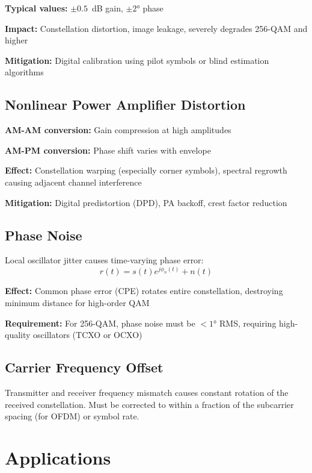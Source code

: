\textbf{Typical values:} $\pm 0.5$~dB gain, $\pm 2°$ phase

\textbf{Impact:} Constellation distortion, image leakage, severely degrades 256-QAM and higher

\textbf{Mitigation:} Digital calibration using pilot symbols or blind estimation algorithms

\subsection{Nonlinear Power Amplifier Distortion}

\textbf{AM-AM conversion:} Gain compression at high amplitudes

\textbf{AM-PM conversion:} Phase shift varies with envelope

\textbf{Effect:} Constellation warping (especially corner symbols), spectral regrowth causing adjacent channel interference

\textbf{Mitigation:} Digital predistortion (DPD), PA backoff, crest factor reduction

\subsection{Phase Noise}

Local oscillator jitter causes time-varying phase error:
\begin{equation}
r(t) = s(t) e^{j\phi_n(t)} + n(t)
\end{equation}

\textbf{Effect:} Common phase error (CPE) rotates entire constellation, destroying minimum distance for high-order QAM

\textbf{Requirement:} For 256-QAM, phase noise must be $< 1°$ RMS, requiring high-quality oscillators (TCXO or OCXO)

\subsection{Carrier Frequency Offset}

Transmitter and receiver frequency mismatch causes constant rotation of the received constellation. Must be corrected to within a fraction of the subcarrier spacing (for OFDM) or symbol rate.

\section{Applications}

